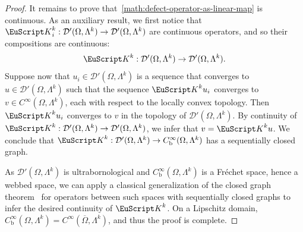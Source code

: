 \documentclass[10pt,a4paper]{amsart}
\theoremstyle{definition}
\theoremstyle{remark}
\numberwithin{equation}{section}
\newcommand{\calD}{{\mathcal D}}
\newcommand{\euK}{{\EuScript K}}
\newcommand{\closure}{\overline}
\newcommand{\Domain}{{\Omega}}
\newcommand{\Alt}[1]{\Lambda^{#1}}
\newcommand{\Defect}{\euK}
\newcommand{\bounded}{\mathrm{b}}
\begin{document}
\begin{proof}
    It remains to prove that~\eqref{math:defect-operator-as-linear-map} is continuous. 
    As an auxiliary result, 
    we first notice that $\Defect^{k}_{i} : \calD'(\Domain,\Alt{k}) \to \calD'(\Domain,\Alt{k})$ are continuous operators,
    and so their compositions are continuous:
    \begin{align}\label{math:defect-between-distributions}
        \Defect^{k} : \calD'(\Domain,\Alt{k}) \to \calD'(\Domain,\Alt{k})
        .
    \end{align}
    Suppose now that $u_{i} \in \calD'(\Domain,\Alt{k})$ is a sequence that converges to $u \in \calD'(\Domain,\Alt{k})$
    such that the sequence $\Defect^{k} u_{i}$ converges to $v \in C^{\infty}(\Domain,\Alt{k})$,
    each with respect to the locally convex topology.
    Then $\Defect^{k} u_{i}$ converges to $v$ in the topology of $\calD'(\Domain,\Alt{k})$.
    By continuity of $\Defect^{k} : \calD'(\Domain,\Alt{k}) \to \calD'(\Domain,\Alt{k})$, we infer that $v = \Defect^{k} u$. 
    We conclude that $\Defect^{k} : \calD'(\Domain,\Alt{k}) \to C^{\infty}_{\bounded}(\Domain,\Alt{k})$ has a sequentially closed graph.
    
    As $\calD'(\Domain,\Alt{k})$ is ultrabornological and $C^{\infty}_{\bounded}(\Domain,\Alt{k})$ is a Fr\'echet space, hence a webbed space,
    we can apply a classical generalization of the closed graph theorem~\cite[35.2]{koethe2} for operators between such spaces with sequentially closed graphs 
    to infer the desired continuity of $\Defect^{k}$.
    On a Lipschitz domain, $C^{\infty}_{\bounded}(\Domain,\Alt{k}) = C^{\infty}(\closure\Domain,\Alt{k})$, and thus the proof is complete. \end{proof}
\end{document}
